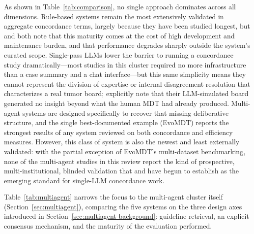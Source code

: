 \documentclass[acmsmall,screen=true,review=false,nonacm=true]{acmart}
\begin{document}
As shown in Table~\ref{tab:comparison}, no single approach dominates across all dimensions. Rule-based systems remain the most extensively validated in aggregate concordance terms, largely because they have been studied longest, but \citet{wu2026} and \citet{oehring2023} both note that this maturity comes at the cost of high development and maintenance burden, and that performance degrades sharply outside the system's curated scope. Single-pass LLMs lower the barrier to running a concordance study dramatically---most studies in this cluster required no more infrastructure than a case summary and a chat interface---but this same simplicity means they cannot represent the division of expertise or internal disagreement resolution that characterizes a real tumor board; \citet{ismayilov2025} explicitly note that their LLM-simulated board generated no insight beyond what the human MDT had already produced. Multi-agent systems are designed specifically to recover that missing deliberative structure, and the single best-documented example (EvoMDT) reports the strongest results of any system reviewed on both concordance and efficiency measures. However, this class of system is also the newest and least externally validated: with the partial exception of EvoMDT's multi-dataset benchmarking, none of the multi-agent studies in this review report the kind of prospective, multi-institutional, blinded validation that \citet{pinninti2026} and \citet{seshachalam2026} have begun to establish as the emerging standard for single-LLM concordance work.

Table~\ref{tab:multiagent} narrows the focus to the multi-agent cluster itself (Section~\ref{sec:multiagent}), comparing the five systems on the three design axes introduced in Section~\ref{sec:multiagent-background}: guideline retrieval, an explicit consensus mechanism, and the maturity of the evaluation performed.
\end{document}
